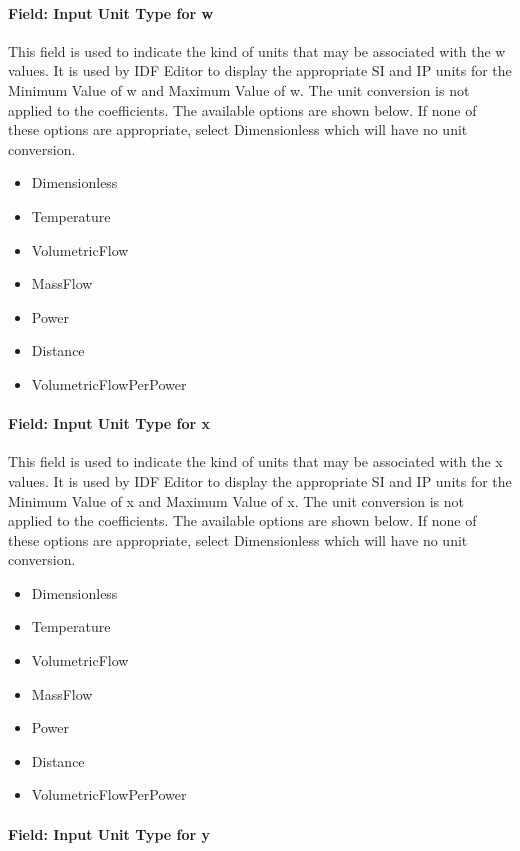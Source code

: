 \paragraph{Field: Input Unit Type for w}\label{field-input-unit-type-for-w}

This field is used to indicate the kind of units that may be associated with the w values. It is used by IDF Editor to display the appropriate SI and IP units for the Minimum Value of w and Maximum Value of w. The unit conversion is not applied to the coefficients. The available options are shown below. If none of these options are appropriate, select Dimensionless which will have no unit conversion.

\begin{itemize}
\item
  Dimensionless
\item
  Temperature
\item
  VolumetricFlow
\item
  MassFlow
\item
  Power
\item
  Distance
\item
  VolumetricFlowPerPower
\end{itemize}

\paragraph{Field: Input Unit Type for x}\label{field-input-unit-type-for-x-1}

This field is used to indicate the kind of units that may be associated with the x values. It is used by IDF Editor to display the appropriate SI and IP units for the Minimum Value of x and Maximum Value of x. The unit conversion is not applied to the coefficients. The available options are shown below. If none of these options are appropriate, select Dimensionless which will have no unit conversion.

\begin{itemize}
\item
  Dimensionless
\item
  Temperature
\item
  VolumetricFlow
\item
  MassFlow
\item
  Power
\item
  Distance
\item
  VolumetricFlowPerPower
\end{itemize}

\paragraph{Field: Input Unit Type for y}\label{field-input-unit-type-for-y}

